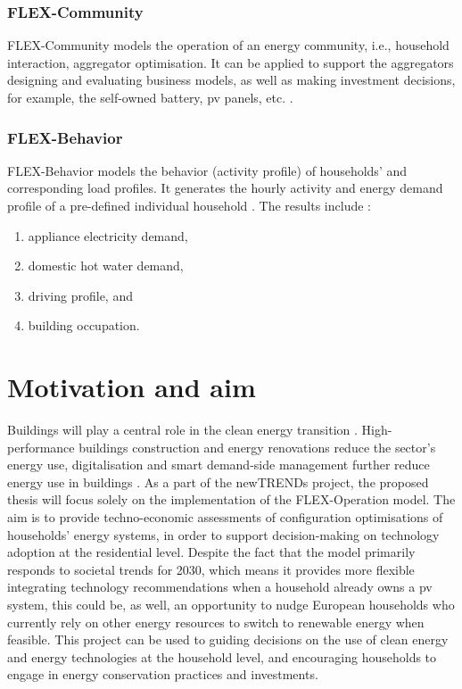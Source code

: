 \subsubsection{FLEX-Community}


FLEX-Community models the operation of an energy community, i.e., household interaction, aggregator optimisation. 
It can be applied to support the aggregators designing and evaluating business models, as well as making investment decisions, for example, the self-owned battery, \gls{pv} panels, etc. \cite{newtrends}.


\subsubsection{FLEX-Behavior}


FLEX-Behavior models the behavior (activity profile) of households' and corresponding load profiles. 
It generates the hourly activity and energy demand profile of a pre-defined individual household \cite{newtrends}. 
The results include \cite{newtrends}: 

\begin{enumerate}
  \item appliance electricity demand,
  \item domestic hot water demand,
  \item driving profile, and
  \item building occupation.
\end{enumerate}




\section{Motivation and aim}




Buildings will play a central role in the clean energy transition \cite{building}.
High-performance buildings construction and energy renovations reduce the sector’s energy use, digitalisation and smart demand-side management further reduce energy use in buildings \cite{building}.  
As a part of the newTRENDs project, 
the proposed thesis will focus solely on 
the implementation of the FLEX-Operation model.  
The aim is to provide techno-economic assessments 
of configuration optimisations of households' energy systems, 
in order to support decision-making on technology adoption at the residential level. 
Despite the fact that the model primarily responds to societal trends for 2030, 
which means it provides more flexible integrating technology recommendations when a household already owns a \gls{pv} system, 
this could be, as well, an opportunity to nudge European households who currently rely on other energy resources
to switch to renewable energy when feasible. 
This project can be used to 
guiding decisions on the use of clean energy and energy technologies at the household level, 
and encouraging households to engage in energy conservation practices and investments. 


